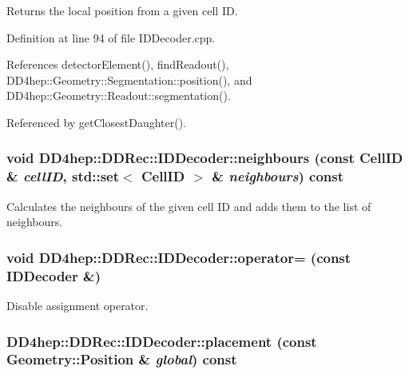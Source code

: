 Returns the local position from a given cell ID. 

Definition at line 94 of file IDDecoder.cpp.

References detectorElement(), findReadout(), DD4hep::Geometry::Segmentation::position(), and DD4hep::Geometry::Readout::segmentation().

Referenced by getClosestDaughter().\hypertarget{class_d_d4hep_1_1_d_d_rec_1_1_i_d_decoder_a410a09ded8a10fb587255ada3910d849}{
\subsubsection[{neighbours}]{\setlength{\rightskip}{0pt plus 5cm}void DD4hep::DDRec::IDDecoder::neighbours (const {\bf CellID} \& {\em cellID}, \/  std::set$<$ {\bf CellID} $>$ \& {\em neighbours}) const}}
\label{class_d_d4hep_1_1_d_d_rec_1_1_i_d_decoder_a410a09ded8a10fb587255ada3910d849}


Calculates the neighbours of the given cell ID and adds them to the list of neighbours. \hypertarget{class_d_d4hep_1_1_d_d_rec_1_1_i_d_decoder_ac635e457d5748ceb74f795a6f8ad8a46}{
\subsubsection[{operator=}]{\setlength{\rightskip}{0pt plus 5cm}void DD4hep::DDRec::IDDecoder::operator= (const {\bf IDDecoder} \&)}}
\label{class_d_d4hep_1_1_d_d_rec_1_1_i_d_decoder_ac635e457d5748ceb74f795a6f8ad8a46}


Disable assignment operator. \hypertarget{class_d_d4hep_1_1_d_d_rec_1_1_i_d_decoder_a818a4762684755b9bab753a3b5118b25}{
\subsubsection[{placement}]{ DD4hep::DDRec::IDDecoder::placement (const {\bf Geometry::Position} \& {\em global}) const}}
\label{class_d_d4hep_1_1_d_d_rec_1_1_i_d_decoder_a818a4762684755b9bab753a3b5118b25}


